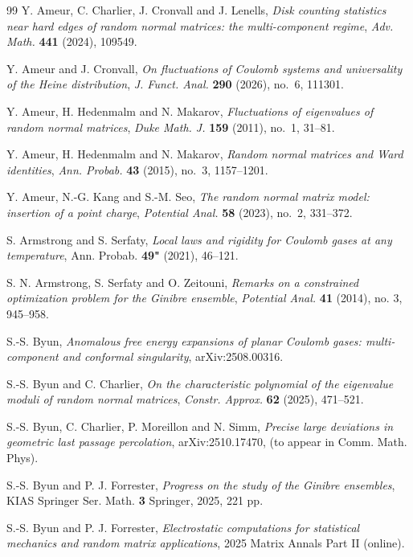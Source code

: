 \documentclass[a4paper]{article}
\numberwithin{equation}{section}
\begin{document}
\begin{thebibliography}{99}
Y. Ameur, C. Charlier, J. Cronvall and J. Lenells,
\emph{Disk counting statistics near hard edges of random normal matrices: the multi-component regime},
\textit{Adv. Math.} \textbf{441} (2024), 109549.

Y. Ameur and J. Cronvall,
\emph{On fluctuations of Coulomb systems and universality of the Heine distribution},
\textit{J. Funct. Anal.} \textbf{290} (2026), no.~6, 111301.

Y. Ameur, H. Hedenmalm and N. Makarov,
\emph{Fluctuations of eigenvalues of random normal matrices},
\textit{Duke Math. J.} \textbf{159} (2011), no.~1, 31--81.

Y. Ameur, H. Hedenmalm and N. Makarov,
\emph{Random normal matrices and Ward identities},
\textit{Ann. Probab.} \textbf{43} (2015), no.~3, 1157--1201.

 Y. Ameur, N.-G. Kang and S.-M. Seo, \emph{The random normal matrix model: insertion of a point charge}, \textit{Potential Anal.} \textbf{58} (2023), no.~2, 331--372.

S. Armstrong and S. Serfaty, \emph{Local laws and rigidity for Coulomb gases at any temperature}, Ann. Probab. \textbf{49"} (2021), 46--121.

 S. N. Armstrong, S. Serfaty and O. Zeitouni, \emph{Remarks on a constrained optimization problem for the Ginibre ensemble}, \textit{Potential Anal.} \textbf{41} (2014), no. 3, 945--958.





S.-S. Byun, \emph{Anomalous free energy expansions of planar Coulomb gases: multi-component and conformal singularity}, arXiv:2508.00316.

S.-S. Byun and C. Charlier,
\emph{On the characteristic polynomial of the eigenvalue moduli of random normal matrices},
\textit{Constr. Approx.} \textbf{62} (2025), 471--521.

S.-S. Byun, C. Charlier, P. Moreillon and N. Simm, \emph{Precise large deviations in geometric last passage percolation}, arXiv:2510.17470, (to appear in  Comm. Math. Phys).


 S.-S. Byun and P. J. Forrester, \emph{Progress on the study of the Ginibre ensembles}, KIAS Springer Ser. Math. \textbf{3} Springer, 2025, 221 pp.

S.-S. Byun and P. J. Forrester, \emph{Electrostatic computations for statistical mechanics and random matrix applications}, 2025 Matrix Annals Part II (online).



\end{thebibliography}
\end{document}
